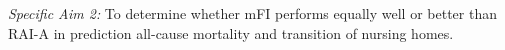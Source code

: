 \emph{Specific Aim 2:} To determine whether mFI performs equally well or better than RAI-A in prediction all-cause mortality and transition of nursing homes.
